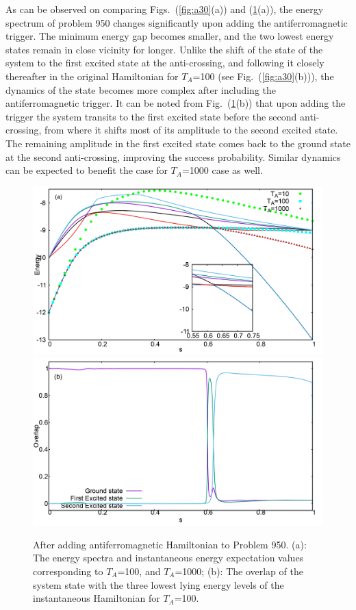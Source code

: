\documentclass[../main.tex]{subfiles}
\begin{document}
\begin{itemize}
As can be observed on comparing Figs.~(\ref{fig:a30}(a)) and (\ref{fig:a32}(a)), the energy spectrum of problem 950 changes significantly upon adding the antiferromagnetic trigger. The minimum energy gap becomes smaller, and the two lowest energy states remain in close vicinity for longer. Unlike the shift of the state of the system to the first excited state at the anti-crossing, and following it closely thereafter in the original Hamiltonian for $T_A$=100 (see Fig.~(\ref{fig:a30}(b))), the dynamics of the state becomes more complex after including the antiferromagnetic trigger. It can be noted from Fig.~(\ref{fig:a32}(b)) that upon adding the trigger the system transits to the first excited state before the second anti-crossing, from where it shifts most of its amplitude to the second excited state. The remaining amplitude in the first excited state comes back to the ground state at the second anti-crossing, improving the success probability. Similar dynamics can be expected to benefit the case for $T_A$=1000 case as well.
\begin{figure}
\centering
  \includegraphics[scale=0.24]{950a_s12_A_g1.png}
  \includegraphics[scale=0.24]{950_A_g1_Overlap.png}
  \caption{After adding antiferromagnetic Hamiltonian to Problem 950. (a): The energy spectra and instantaneous energy expectation values corresponding to $T_A$=100, and $T_A$=1000; (b): The overlap of the system state with the three lowest lying energy levels of the instantaneous Hamiltonian for $T_A$=100.}
   \label{fig:a32}
 \end{figure}




\end{itemize}
\end{document}
